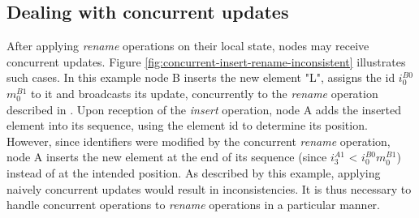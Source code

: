 \documentclass[10pt,journal,compsoc]{IEEEtran}
\newcommand{\trm}[1]{\mathit{#1}}
\newcommand{\id}[3]{$\trm{#1}^{\trm{#2}}_{\trm{#3}}$}
\begin{document}
\subsection{Dealing with concurrent updates}

\label{sec:dealing-with-concurrent-updates}

After applying \emph{rename} operations on their local state, nodes may receive concurrent updates.
Figure \ref{fig:concurrent-insert-rename-inconsistent} illustrates such cases.
In this example node B inserts the new element "L", assigns the id \id{i}{B0}{0}\id{m}{B1}{0} to it and broadcasts its update, concurrently to the \emph{rename} operation described in .
Upon reception of the \emph{insert} operation, node A adds the inserted element into its sequence, using the element id to determine its position.
However, since identifiers were modified by the concurrent \emph{rename} operation, node A inserts the new element at the end of its sequence (since \id{i}{A1}{3} < \id{i}{B0}{0}\id{m}{B1}{0}) instead of at the intended position.
As described by this example, applying naively concurrent updates would result in inconsistencies.
It is thus necessary to handle concurrent operations to \emph{rename} operations in a particular manner.
\end{document}

